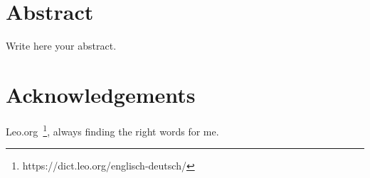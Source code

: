 \documentclass[twoside,12pt,a4paper]{report}
\begin{document}

\setcounter{page}{1}



\section*{Abstract}

Write here your abstract.
\newpage
\section*{Acknowledgements}

Leo.org~\footnote{https://dict.leo.org/englisch-deutsch/}, always finding the right words for me. 

\cleardoublepage


\renewcommand{\baselinestretch}{1.3}
\small\normalsize

\tableofcontents

\renewcommand{\baselinestretch}{1}
\small\normalsize

\cleardoublepage


\renewcommand{\baselinestretch}{1.3}
\small\normalsize

\listoffigures

\renewcommand{\baselinestretch}{1}
\small\normalsize

\cleardoublepage


\renewcommand{\baselinestretch}{1.3}
\small\normalsize
\end{document}
